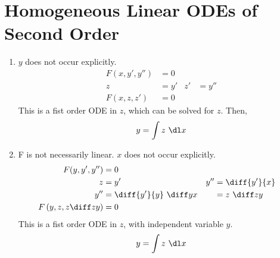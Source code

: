 \section{Homogeneous Linear ODEs of Second Order}

\begin{enumerate}
    \item $ y $ does not occur explicitly.
          \begin{align}
              F(x, y', y'') & = 0               \\
              z             & = y' & z' & = y'' \\
              F(x, z, z')   & = 0
          \end{align}
          This is a fist order ODE in $ z $, which can be solved for $ z $. Then,
          \begin{align}
              y = \int z\ \dl x
          \end{align}

    \item F is not necessarily linear. $ x $ does not occur explicitly.
          \begin{align}
              F(y, y', y'')                    & = 0                         \\
              z                                & = y'                      &
              y''                              & = \diff {y'}{x}             \\
              y''                              & = \diff {y'}{y}\ \diff yx &
                                               & = z\ \diff zy               \\
              F\left( y, z, z \diff zy \right) & = 0
          \end{align}
          This is a fist order ODE in $ z $, with independent variable $ y $.
          \begin{align}
              y = \int z\ \dl x
          \end{align}


\end{enumerate}
